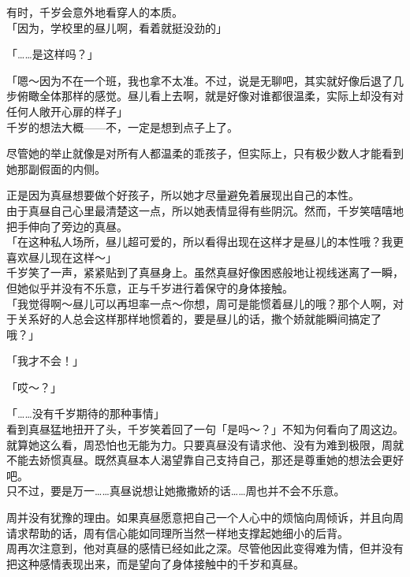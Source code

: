 有时，千岁会意外地看穿人的本质。\\

「因为，学校里的昼儿啊，看着就挺没劲的」

「……是这样吗？」

「嗯～因为不在一个班，我也拿不太准。不过，说是无聊吧，其实就好像后退了几步俯瞰全体那样的感觉。昼儿看上去啊，就是好像对谁都很温柔，实际上却没有对任何人敞开心扉的样子」\\

千岁的想法大概——不，一定是想到点子上了。

尽管她的举止就像是对所有人都温柔的乖孩子，但实际上，只有极少数人才能看到她那副假面的内侧。

正是因为真昼想要做个好孩子，所以她才尽量避免着展现出自己的本性。\\

由于真昼自己心里最清楚这一点，所以她表情显得有些阴沉。然而，千岁笑嘻嘻地把手伸向了旁边的真昼。\\

「在这种私人场所，昼儿超可爱的，所以看得出现在这样才是昼儿的本性哦？我更喜欢昼儿现在这样～」\\

千岁笑了一声，紧紧贴到了真昼身上。虽然真昼好像困惑般地让视线迷离了一瞬，但她似乎并没有不乐意，正与千岁进行着保守的身体接触。\\

「我觉得啊～昼儿可以再坦率一点～你想，周可是能惯着昼儿的哦？那个人啊，对于关系好的人总会这样那样地惯着的，要是昼儿的话，撒个娇就能瞬间搞定了哦？」

「我才不会！」

「哎～？」

「……没有千岁期待的那种事情」\\

看到真昼猛地扭开了头，千岁笑着回了一句「是吗～？」不知为何看向了周这边。\\

就算她这么看，周恐怕也无能为力。只要真昼没有请求他、没有为难到极限，周就不能去娇惯真昼。既然真昼本人渴望靠自己支持自己，那还是尊重她的想法会更好吧。\\

只不过，要是万一……真昼说想让她撒撒娇的话……周也并不会不乐意。

周并没有犹豫的理由。如果真昼愿意把自己一个人心中的烦恼向周倾诉，并且向周请求帮助的话，周有信心能如同理所当然一样地支撑起她细小的后背。\\

周再次注意到，他对真昼的感情已经如此之深。尽管他因此变得难为情，但并没有把这种感情表现出来，而是望向了身体接触中的千岁和真昼。\\

